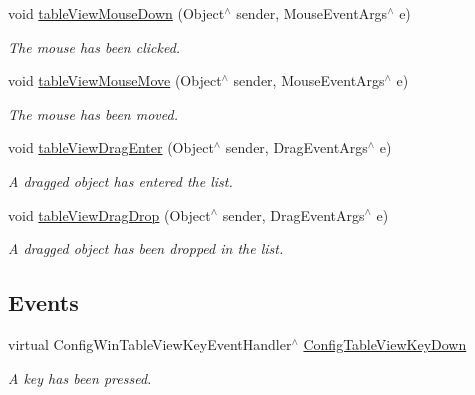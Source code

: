 \begin{DoxyCompactItemize}
\mbox{\label{classConfigWinTableView_a442481e0961b30b66795fb3e03b652e2}} 
void \hyperlink{classConfigWinTableView_a442481e0961b30b66795fb3e03b652e2}{table\+View\+Mouse\+Down} (Object$^\wedge$ sender, Mouse\+Event\+Args$^\wedge$ e)
\begin{DoxyCompactList}\small\item\em The mouse has been clicked. \end{DoxyCompactList}\item 
\mbox{\label{classConfigWinTableView_a24eb847e5dbac7375fba96a718dea5fc}} 
void \hyperlink{classConfigWinTableView_a24eb847e5dbac7375fba96a718dea5fc}{table\+View\+Mouse\+Move} (Object$^\wedge$ sender, Mouse\+Event\+Args$^\wedge$ e)
\begin{DoxyCompactList}\small\item\em The mouse has been moved. \end{DoxyCompactList}\item 
\mbox{\label{classConfigWinTableView_a43523fa68d77c79b1bb62430db018dd1}} 
void \hyperlink{classConfigWinTableView_a43523fa68d77c79b1bb62430db018dd1}{table\+View\+Drag\+Enter} (Object$^\wedge$ sender, Drag\+Event\+Args$^\wedge$ e)
\begin{DoxyCompactList}\small\item\em A dragged object has entered the list. \end{DoxyCompactList}\item 
\mbox{\label{classConfigWinTableView_a8a74aaf5e91957b5669f94c7e7741f61}} 
void \hyperlink{classConfigWinTableView_a8a74aaf5e91957b5669f94c7e7741f61}{table\+View\+Drag\+Drop} (Object$^\wedge$ sender, Drag\+Event\+Args$^\wedge$ e)
\begin{DoxyCompactList}\small\item\em A dragged object has been dropped in the list. \end{DoxyCompactList}\end{DoxyCompactItemize}
\subsection*{Events}
\begin{DoxyCompactItemize}
\item 
\mbox{\label{classConfigWinTableView_a1d83b0981b052d268c7ddc6e9b4a897b}} 
virtual Config\+Win\+Table\+View\+Key\+Event\+Handler$^\wedge$ \hyperlink{classConfigWinTableView_a1d83b0981b052d268c7ddc6e9b4a897b}{Config\+Table\+View\+Key\+Down}
\begin{DoxyCompactList}\small\item\em A key has been pressed. \end{DoxyCompactList}\end{DoxyCompactItemize}
